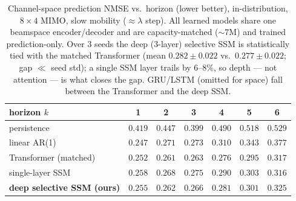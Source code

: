\documentclass[11pt]{article}
\begin{document}
\begin{table}[h]
\centering
\begin{tabular}{lcccccc}
\toprule
horizon $k$ & 1 & 2 & 3 & 4 & 5 & 6 \\
\midrule
persistence & $0.419$ & $0.447$ & $0.399$ & $0.490$ & $0.518$ & $0.529$ \\
linear AR(1) & $0.247$ & $0.271$ & $0.273$ & $0.310$ & $0.343$ & $0.377$ \\
\midrule
Transformer (matched) & $0.252$ & $0.261$ & $0.263$ & $0.276$ & $0.295$ & $0.317$ \\
single-layer SSM & $0.258$ & $0.268$ & $0.275$ & $0.290$ & $0.303$ & $0.316$ \\
\textbf{deep selective SSM (ours)} & $0.255$ & $0.262$ & $0.266$ & $0.281$ & $0.301$ & $0.325$ \\
\bottomrule
\end{tabular}
\caption{Channel-space prediction NMSE vs.\ horizon (lower better), in-distribution, $8\times4$ MIMO,
slow mobility ($\approx\!\lambda$ step). All learned models share one beamspace encoder/decoder and are
capacity-matched ($\sim\!7$M) and trained prediction-only. Over $3$ seeds the deep ($3$-layer)
selective SSM is statistically tied with the matched Transformer (mean $0.282\!\pm\!0.022$ vs.\
$0.277\!\pm\!0.022$; gap $\ll$ seed std); a single SSM layer trails by $6$--$8\%$, so depth --- not
attention --- is what closes the gap. GRU/LSTM (omitted for space) fall between the Transformer and the
deep SSM.}
\label{tab:pred}
\end{table}
\end{document}
